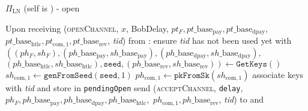 \begin{protocolbox}{$\Pi_{\mathrm{LN}}$ (self is \alice) - open}
  \label{alg:protocol:open}
  \begin{algorithmic}[1]
    \State Upon receiving (\textsc{openChannel}, $x$, BobDelay, $pt_F,
    pt\_\mathrm{base}_{\mathrm{pay}}, pt\_\mathrm{base}_{\mathrm{dpay}},$
    $pt\_\mathrm{base}_{\mathrm{htlc}}, pt_{\mathrm{com}, 1},
    pt\_\mathrm{base}_{\mathrm{rev}}$, \textit{tid}) from \bob:
    \Indent
      \State ensure \textit{tid} has not been used yet with \bob
      \State $\left(\left(ph_F, sh_F\right),
      \left(ph\_\mathrm{base}_{\mathrm{pay}},
      sh\_\mathrm{base}_{\mathrm{pay}}\right),
      \left(ph\_\mathrm{base}_{\mathrm{dpay}},
      sh\_\mathrm{base}_{\mathrm{dpay}}\right),\right.$
      $\left.\left(ph\_\mathrm{base}_{\mathrm{htlc}},
      sh\_\mathrm{base}_{\mathrm{htlc}}\right), \mathtt{seed},
      \left(ph\_\mathrm{base}_{\mathrm{rev}},
      sh\_\mathrm{base}_{\mathrm{rev}}\right)\right) \gets
      \texttt{GetKeys}\left(\right)$
      \State $sh_{\mathrm{com}, 1} \gets
      \texttt{genFromSeed}\left(\mathtt{seed}, 1\right)$
      \State $ph_{\mathrm{com}, 1} \gets
      \mathtt{pkFromSk}\left(sh_{\mathrm{com}, 1}\right)$
      \State associate keys with \textit{tid} and store in \texttt{pendingOpen}
      \State send (\textsc{acceptChannel}, \texttt{delay}, $ph_F,
      ph\_\mathrm{base}_{\mathrm{pay}}, ph\_\mathrm{base}_{\mathrm{dpay}},
      ph\_\mathrm{base}_{\mathrm{htlc}},$ $ph_{\mathrm{com}, 1},
      ph\_\mathrm{base}_{\mathrm{rev}}$, \textit{tid}) to \bob{} and \adversary
    \EndIndent
    \State


\end{algorithmic}
\end{protocolbox}
